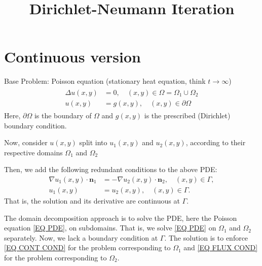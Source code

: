 \documentclass[a4paper,10pt]{article}
\title{Dirichlet-Neumann Iteration}
\begin{document}
\maketitle
% 
\section{Continuous version}
% 
\begin{center}
\end{center}
% 
Base Problem: Poisson equation (stationary heat equation, think $t\rightarrow \infty$)
% 
\begin{align}\label{EQ PDE}
\begin{split}
\Delta u (x, y) &= 0, \quad (x, y) \in \Omega = \Omega_1 \cup \Omega_2 \\
u(x, y) &= g(x, y), \quad (x, y) \in \partial \Omega
\end{split}
\end{align}
% 
Here, $\partial \Omega$ is the boundary of $\Omega$ and $g(x, y)$ is the prescribed (Dirichlet) boundary condition.

Now, consider $u(x, y)$ split into $u_1(x, y)$ and $u_2(x, y)$, according to their respective domains $\Omega_1$ and $\Omega_2$

Then, we add the following redundant conditions to the above PDE:
%
\begin{align}
\nabla u_1 (x, y) \cdot \bm{n}_1 &= -\nabla u_2 (x, y) \cdot \bm{n}_2, \quad (x, y) \in \Gamma, \label{EQ FLUX COND}\\
u_1 (x, y) & = u_2 (x, y), \quad (x, y) \in \Gamma. \label{EQ CONT COND}
\end{align}
% 
That is, the solution and its derivative are continuous at $\Gamma$.

The domain decomposition approach is to solve the PDE, here the Poisson equation \eqref{EQ PDE}, on subdomains. That is, we solve \eqref{EQ PDE} on $\Omega_1$ and $\Omega_2$ separately. Now, we lack a boundary condition at $\Gamma$. The solution is to enforce \eqref{EQ CONT COND} for the problem corresponding to $\Omega_1$ and \eqref{EQ FLUX COND} for the problem corresponding to $\Omega_2$.
\end{document}
